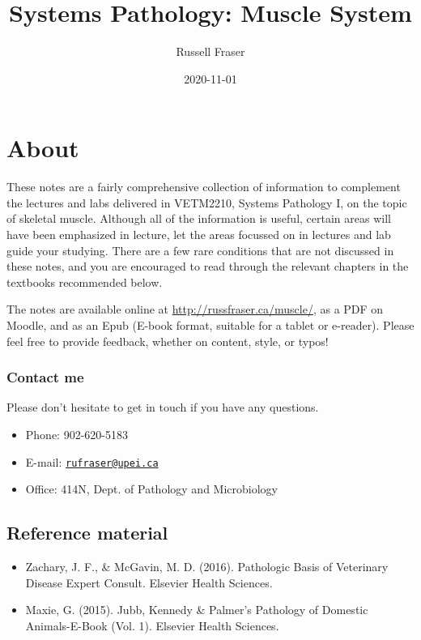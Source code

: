 \documentclass[openany]{book}
\title{Systems Pathology: Muscle System}
\author{Russell Fraser}
\date{2020-11-01}
\providecommand{\tightlist}{%
  \setlength{\itemsep}{0pt}\setlength{\parskip}{0pt}}
\begin{document}
\maketitle

{
\setcounter{tocdepth}{1}
\tableofcontents
}
\chapter*{About}\label{about}

These notes are a fairly comprehensive collection of information to
complement the lectures and labs delivered in VETM2210, Systems
Pathology I, on the topic of skeletal muscle. Although all of the
information is useful, certain areas will have been emphasized in
lecture, let the areas focussed on in lectures and lab guide your
studying. There are a few rare conditions that are not discussed in
these notes, and you are encouraged to read through the relevant
chapters in the textbooks recommended below.

The notes are available online at \url{http://russfraser.ca/muscle/}, as
a PDF on Moodle, and as an Epub (E-book format, suitable for a tablet or
e-reader). Please feel free to provide feedback, whether on content,
style, or typos!

\subsection*{Contact me}\label{contact-me}

Please don't hesitate to get in touch if you have any questions.

\begin{itemize}
\tightlist
\item
  Phone: 902-620-5183
\item
  E-mail: \href{mailto:rufraser@upei.ca}{\nolinkurl{rufraser@upei.ca}}
\item
  Office: 414N, Dept. of Pathology and Microbiology
\end{itemize}

\section*{Reference material}\label{reference-material}

\begin{itemize}
\tightlist
\item
  Zachary, J. F., \& McGavin, M. D. (2016). Pathologic Basis of
  Veterinary Disease Expert Consult. Elsevier Health Sciences.
\item
  Maxie, G. (2015). Jubb, Kennedy \& Palmer's Pathology of Domestic
  Animals-E-Book (Vol. 1). Elsevier Health Sciences.
\end{itemize}
\end{document}
